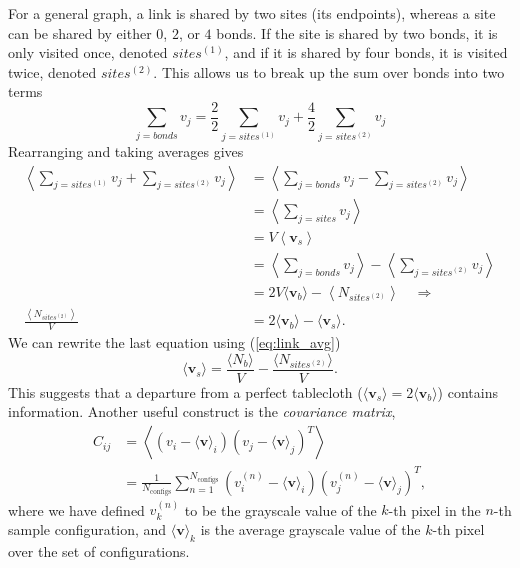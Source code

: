 \documentclass[../main.tex]{subfiles}
\begin{document}
%
For a general graph, a link is shared by two sites (its endpoints), whereas a
site can be shared by either $0$, $2$, or $4$ bonds.  
%
If the site is shared by two bonds, it is only visited once, denoted
$sites^{(1)}$, and if it is shared by four bonds, it is visited twice, denoted
$sites^{(2)}$.
%
This allows us to break up the sum over bonds into two terms
%
\begin{equation}
    \sum_{j=bonds} v_j = \frac{2}{2}\sum_{j=sites^{(1)}} v_j
        + \frac{4}{2} \sum_{j=sites^{(2)}} v_j
\end{equation}
%
Rearranging and taking averages gives
%
\begin{align}
    \left\langle \sum_{j=sites^{(1)}} v_j \right. 
    + \left. \sum_{j=sites^{(2)}} v_j \right\rangle
    &=\left\langle \sum_{j=bonds} v_j - \sum_{j=sites^{(2)}} v_j \right\rangle\\
    &= \left\langle \sum_{j=sites} v_j\right\rangle\\
    &= V\left\langle \mathbf{v}_s\right\rangle\\
    & = \left\langle \sum_{j=bonds} v_j \right\rangle - \left\langle
        \sum_{j=sites^{(2)}} v_j \right\rangle\\
    &= 2V \langle\mathbf{v}_b\rangle - \left\langle
        N_{sites^{(2)}}\right\rangle\quad\Longrightarrow\\
    \frac{\left\langle N_{sites^{(2)}}\right\rangle}{V} &=
        2\langle\mathbf{v}_b\rangle - \langle \mathbf{v}_s\rangle.
\end{align}
%
We can rewrite the last equation using (\ref{eq:link_avg})
%
\begin{equation}
    \langle \mathbf{v}_s \rangle= \frac{\langle N_b\rangle}{V} - \frac{\langle
        N_{sites^{(2)}}\rangle}{V}.
\end{equation}
%
This suggests that a departure from a perfect tablecloth ($\langle
\mathbf{v}_s\rangle = 2\langle \mathbf{v}_b\rangle$) contains information.
%
%
%
%
Another useful construct is the \emph{covariance matrix},
%
\begin{align}
    C_{ij} &=
    \left\langle\left(v_i -\langle \mathbf{v}\rangle_i\right)
    {\left(v_j -\langle \mathbf{v}\rangle_j\right)}^{T}\right\rangle\\
        &= \frac{1}{N_{\mathrm{configs}}}\sum_{n=1}^{N_{\mathrm{configs}}}
        {\left(v_i^{(n)} -\langle \mathbf{v}\rangle_i\right)}
        {\left(v_j^{(n)} -\langle \mathbf{v}\rangle_j\right)}^{T},
\label{covariance_matrix}
\end{align}
%
where we have defined $v_k^{(n)}$ to be the grayscale value of the $k$-th pixel
in the $n$-th sample configuration, and $\langle \mathbf{v}\rangle_k$ is the
average grayscale value of the $k$-th pixel over the set of configurations.
\end{document}
